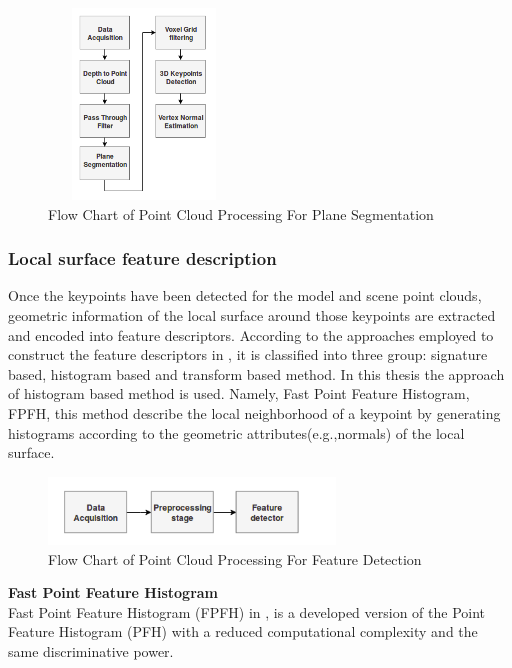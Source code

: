 \begin{figure}[!h]
\begin{center}
\includegraphics[width=2in,height=2in]{diagrams/vertexnormal.png}
\caption{Flow Chart of Point Cloud Processing For Plane Segmentation}
\label{fig:planesegmentation}
\end{center}
\end{figure}
\subsubsection{Local surface feature description}

Once the keypoints have been detected for the model and scene point clouds, geometric information of the local surface around those keypoints are extracted and encoded into feature descriptors. According to the approaches employed to construct the feature descriptors in \cite{survey}, it is classified into three group: signature based, histogram based and transform based method. In this thesis the approach of histogram based method is used. Namely, Fast Point Feature Histogram, FPFH, this method describe the local neighborhood of a keypoint by generating histograms according to the geometric attributes(e.g.,normals) of the local surface.

\begin{figure}[!h]
\begin{center}
\includegraphics[width=3in]{diagrams/fpfh.png}
\caption{Flow Chart of Point Cloud Processing For Feature Detection}
\label{fig:fpfh}
\end{center}
\end{figure}

\noindent
\textbf{Fast Point Feature Histogram}\\
Fast Point Feature Histogram (FPFH) in \cite{algFpfh}, is a developed version of the Point Feature Histogram (PFH) \cite{algFpfh} with a reduced computational complexity and the same discriminative power. 

